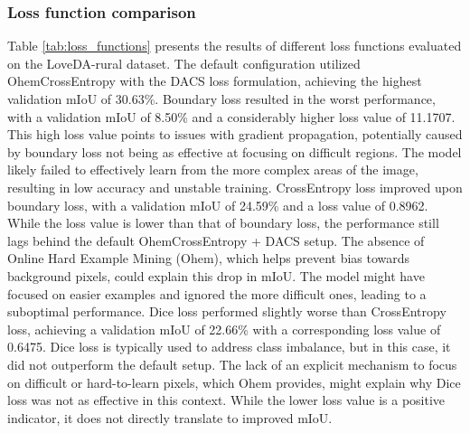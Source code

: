 \documentclass{article}
\begin{document}
	\begin{multicols}{2}





        \subsubsection{Loss function comparison}
        \justifying
        Table \ref{tab:loss_functions} presents the results of different loss functions evaluated on the LoveDA-rural dataset. The default configuration utilized OhemCrossEntropy with the DACS loss formulation, achieving the highest validation mIoU of 30.63\%. 
        Boundary loss resulted in the worst performance, with a validation mIoU of 8.50\% and a considerably higher loss value of 11.1707. This high loss value points to issues with gradient propagation, potentially caused by boundary loss not being as effective at focusing on difficult regions. The model likely failed to effectively learn from the more complex areas of the image, resulting in low accuracy and unstable training.
        CrossEntropy loss improved upon boundary loss, with a validation mIoU of 24.59\% and a loss value of 0.8962. While the loss value is lower than that of boundary loss, the performance still lags behind the default OhemCrossEntropy + DACS setup. The absence of Online Hard Example Mining (Ohem), which helps prevent bias towards background pixels, could explain this drop in mIoU. The model might have focused on easier examples and ignored the more difficult ones, leading to a suboptimal performance.
        Dice loss performed slightly worse than CrossEntropy loss, achieving a validation mIoU of 22.66\% with a corresponding loss value of 0.6475. Dice loss is typically used to address class imbalance, but in this case, it did not outperform the default setup. The lack of an explicit mechanism to focus on difficult or hard-to-learn pixels, which Ohem provides, might explain why Dice loss was not as effective in this context. While the lower loss value is a positive indicator, it does not directly translate to improved mIoU.

        
        \begin{table}[H]
			\centering
			\renewcommand{\arraystretch}{1.4} %
			\setlength{\tabcolsep}{6pt} %
			
			\caption{Performance comparison of different loss functions.}
			\label{tab:loss_functions}


\end{table}
\end{multicols}
\end{document}
